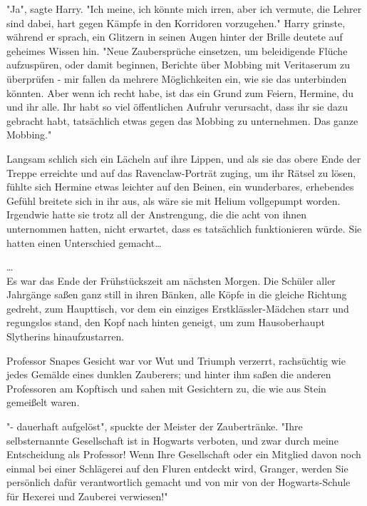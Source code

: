 {"Ja", sagte Harry. "Ich meine, ich könnte mich irren, aber ich vermute, die Lehrer sind dabei, hart gegen Kämpfe in den Korridoren vorzugehen." Harry grinste, während er sprach, ein Glitzern in seinen Augen hinter der Brille deutete auf geheimes Wissen hin. "Neue Zaubersprüche einsetzen, um beleidigende Flüche aufzuspüren, oder damit beginnen, Berichte über Mobbing mit Veritaserum zu überprüfen - mir fallen da mehrere Möglichkeiten ein, wie sie das unterbinden könnten. Aber wenn ich recht habe, ist das ein Grund zum Feiern, Hermine, du und ihr alle. Ihr habt so viel öffentlichen Aufruhr verursacht, dass ihr sie dazu gebracht habt, tatsächlich etwas gegen das Mobbing zu unternehmen. Das ganze Mobbing."

Langsam schlich sich ein Lächeln auf ihre Lippen, und als sie das obere Ende der Treppe erreichte und auf das Ravenclaw-Porträt zuging, um ihr Rätsel zu lösen, fühlte sich Hermine etwas leichter auf den Beinen, ein wunderbares, erhebendes Gefühl breitete sich in ihr aus, als wäre sie mit Helium vollgepumpt worden. Irgendwie hatte sie trotz all der Anstrengung, die die acht von ihnen unternommen hatten, nicht erwartet, dass es tatsächlich funktionieren würde. Sie hatten einen Unterschied gemacht…

…\\ Es war das Ende der Frühstückszeit am nächsten Morgen. Die Schüler aller Jahrgänge saßen ganz still in ihren Bänken, alle Köpfe in die gleiche Richtung gedreht, zum Haupttisch, vor dem ein einziges Erstklässler-Mädchen starr und regungslos stand, den Kopf nach hinten geneigt, um zum Hausoberhaupt Slytherins hinaufzustarren.

Professor Snapes Gesicht war vor Wut und Triumph verzerrt, rachsüchtig wie jedes Gemälde eines dunklen Zauberers; und hinter ihm saßen die anderen Professoren am Kopftisch und sahen mit Gesichtern zu, die wie aus Stein gemeißelt waren.

"- dauerhaft aufgelöst", spuckte der Meister der Zaubertränke. "Ihre selbsternannte Gesellschaft ist in Hogwarts verboten, und zwar durch meine Entscheidung als Professor! Wenn Ihre Gesellschaft oder ein Mitglied davon noch einmal bei einer Schlägerei auf den Fluren entdeckt wird, Granger, werden Sie persönlich dafür verantwortlich gemacht und von mir von der Hogwarts-Schule für Hexerei und Zauberei verwiesen!"

}
